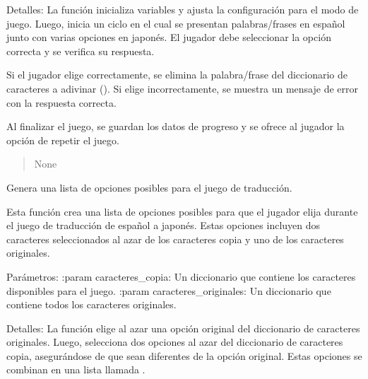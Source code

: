 \documentclass[letterpaper,10pt,spanish]{sphinxmanual}
\begin{document}
\begin{fulllineitems}
\begin{fulllineitems}
\sphinxAtStartPar
Detalles:
La función inicializa variables y ajusta la configuración para el modo de juego.
Luego, inicia un ciclo en el cual se presentan palabras/frases en español junto con varias opciones
en japonés. El jugador debe seleccionar la opción correcta y se verifica su respuesta.

\sphinxAtStartPar
Si el jugador elige correctamente, se elimina la palabra/frase del diccionario de caracteres a adivinar
(). Si elige incorrectamente, se muestra un mensaje de error con la respuesta correcta.

\sphinxAtStartPar
Al finalizar el juego, se guardan los datos de progreso y se ofrece al jugador la opción de repetir el juego.
\begin{quote}\begin{description}
\sphinxAtStartPar
None

\end{description}\end{quote}

\end{fulllineitems}


\begin{fulllineitems}
\label{\detokenize{juego:juego.Juego.generar_opciones}}
\pysigstartsignatures
{}
\pysigstopsignatures
\sphinxAtStartPar
Genera una lista de opciones posibles para el juego de traducción.

\sphinxAtStartPar
Esta función crea una lista de opciones posibles para que el jugador elija durante el juego
de traducción de español a japonés. Estas opciones incluyen dos caracteres seleccionados al azar
de los caracteres copia y uno de los caracteres originales.

\sphinxAtStartPar
Parámetros:
:param caracteres\_copia: Un diccionario que contiene los caracteres disponibles para el juego.
:param caracteres\_originales: Un diccionario que contiene todos los caracteres originales.

\sphinxAtStartPar
Detalles:
La función elige al azar una opción original del diccionario de caracteres originales.
Luego, selecciona dos opciones al azar del diccionario de caracteres copia, asegurándose de que
sean diferentes de la opción original. Estas opciones se combinan en una lista llamada .


\end{fulllineitems}
\end{fulllineitems}
\end{document}
